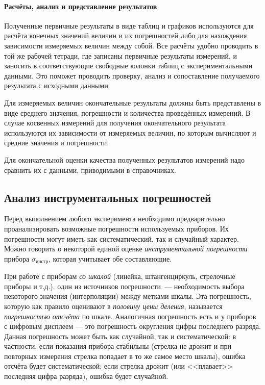 \documentclass[10pt]{article}
\begin{document}
\paragraph{Расчёты, анализ и представление результатов}

Полученные первичные результаты в виде таблиц и графиков используются
для расчёта конечных значений величин и их погрешностей либо для нахождения
зависимости измеряемых величин между собой. Все расчёты удобно проводить
в той же рабочей тетради, где записаны первичные результаты измерений,
и заносить в соответствующие свободные колонки таблиц с экспериментальными
данными. Это поможет проводить проверку, анализ и сопоставление получаемого
результата с исходными данными.

Для измеряемых величин окончательные результаты должны быть представлены
в виде среднего значения, погрешности и количества проведённых измерений.
В случае косвенных измерений для получения окончательного результата
используются их зависимости от измеряемых величин, по которым вычисляют
и средние значения и погрешности.

Для окончательной оценки качества полученных результатов измерений
надо сравнить их с данными, приводимыми в справочниках.%


\subsection{Анализ инструментальных погрешностей}

Перед выполнением любого эксперимента необходимо предварительно проанализировать
возможные погрешности используемых приборов. Их погрешности могут
иметь как систематический, так и случайный характер. Можно говорить
о некоторой единой оценке \emph{инструментальной погрешности} прибора
$\sigma_{\text{инстр}}$, которая учитывает обе составляющие.

При работе с приборам \emph{со шкалой} (линейка, штангенциркуль, стрелочные
приборы и т.д.). один из источников погрешности~--- необходимость
выбора некоторого значения (интерполяции) между метками шкалы. Эта
погрешность, которую как правило оценивают в \emph{половину цены деления},
называется\emph{ погрешностью отсчёта} по шкале. Аналогичная погрешность
есть и у приборов с цифровым дисплеем --- это погрешность
округления цифры последнего разряда. Данная погрешность может быть
как случайной, так и систематической: в частности, если показания
прибора стабильны (стрелка не дрожит и при повторных измерения стрелка
попадает в то же самое место шкалы), ошибка отсчёта будет систематической;
если стрелка дрожит (или <<плавает>> последняя
цифра разряда), ошибка будет случайной. 
\end{document}
